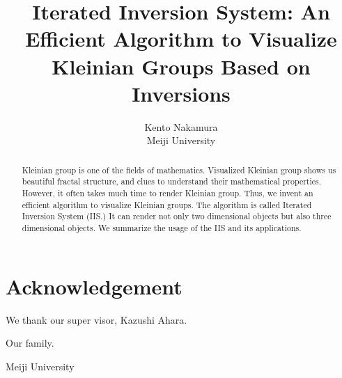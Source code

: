 \documentclass[uplatex, dvipdfmx]{article}
\title{ Iterated Inversion System: An Efficient Algorithm to Visualize Kleinian Groups Based on Inversions }
\author{ Kento Nakamura\\
Meiji University\\
}
\date{}
\begin{document}
\maketitle
\pagestyle{plain}


\begin{abstract}
 Kleinian group is one of the fields of mathematics. Visualized
 Kleinian group shows us beautiful fractal structure, and clues to
 understand their mathematical properties.
 However, it often takes much time to render Kleinian group.
 Thus, we invent an efficient algorithm to visualize Kleinian groups. 
 The algorithm is called Iterated Inversion System
 (IIS.) It can render not only two dimensional objects but also three
 dimensional objects.
 We summarize the usage of the IIS and its applications.
\end{abstract}

\clearpage

\tableofcontents

\clearpage









\section*{Acknowledgement}
We thank our super visor, Kazushi Ahara.

Our family.

Meiji University

\printbibliography
\end{document}
